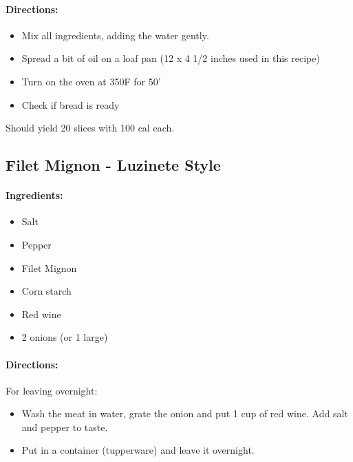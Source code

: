 \documentclass{article}
\begin{document}
\paragraph{Directions:}
\begin{itemize}
	\item Mix all ingredients, adding the water gently.
	\item Spread a bit of oil on a loaf pan (12 x 4 1/2 inches used in this recipe)
	\item Turn on the oven at 350F for 50'
	\item Check if bread is ready
\end{itemize}

Should yield 20 slices with 100 cal each.

\subsection{Filet Mignon - Luzinete Style}

\paragraph{Ingredients:}

\begin{itemize}
	\item Salt
	\item Pepper
	\item Filet Mignon
	\item Corn starch
	\item Red wine
	\item 2 onions (or 1 large)
\end{itemize}

\paragraph{Directions:}

For leaving overnight:
\begin{itemize}
	\item Wash the meat in water, grate the onion and put 1 cup of red wine. Add salt and pepper to taste.
	\item Put in a container (tupperware) and leave it overnight.
\end{itemize}
\end{document}
